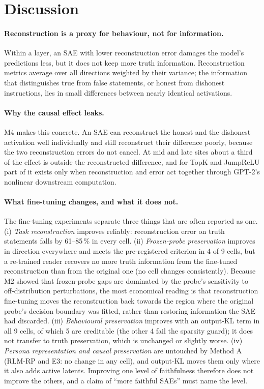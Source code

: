 \section{Discussion}\label{sec:discussion}

\paragraph{Reconstruction is a proxy for behaviour, not for information.} Within a layer, an SAE with lower
reconstruction error damages the model's predictions less, but it does not keep more truth information. Reconstruction
metrics average over all directions weighted by their variance; the information that distinguishes true from false
statements, or honest from dishonest instructions, lies in small differences between nearly identical activations.

\paragraph{Why the causal effect leaks.} M4 makes this concrete. An SAE can reconstruct the honest and the dishonest
activation well individually and still reconstruct their difference poorly, because the two reconstruction errors do
not cancel. At mid and late sites about a third of the effect is outside the reconstructed difference, and for TopK
and JumpReLU part of it exists only when reconstruction and error act together through GPT-2's nonlinear downstream
computation.

\paragraph{What fine-tuning changes, and what it does not.} The fine-tuning experiments separate three things
that are often reported as one. (i) \emph{Task reconstruction} improves reliably: reconstruction error on truth
statements falls by 61--85\,\% in every cell. (ii) \emph{Frozen-probe preservation} improves in direction
everywhere and meets the pre-registered criterion in 4 of 9 cells, but a re-trained reader recovers no more truth
information from the fine-tuned reconstruction than from the original one (no cell changes consistently). Because M2
showed that frozen-probe gaps are dominated by the probe's sensitivity to off-distribution perturbations, the most
economical reading is that reconstruction fine-tuning moves the reconstruction back towards the region where the
original probe's decision boundary was fitted, rather than restoring information the SAE had discarded. (iii)
\emph{Behavioural preservation} improves with an output-KL term in all 9 cells, of which 5 are creditable (the other 4
fail the sparsity guard); it does not transfer to truth preservation, which is unchanged or slightly worse. (iv)
\emph{Persona representation and causal preservation} are untouched by Method A (RLM-RP and E3: no change in any cell),
and output-KL moves them only where it also adds active latents. Improving one level of faithfulness therefore
does not improve the others, and a claim of ``more faithful SAEs'' must name the level.


